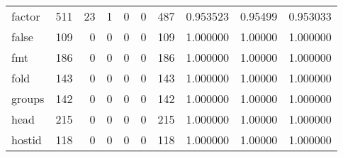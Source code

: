 \begin{longtable}{lrrrrrrrrr}
factor    &                    511 &                                 23 &                                 1 &                                0 &                                 0 &                             487 &                                0.953523 &                                0.95499 &                             0.953033 \\
false     &                    109 &                                  0 &                                 0 &                                0 &                                 0 &                             109 &                                1.000000 &                                1.00000 &                             1.000000 \\
fmt       &                    186 &                                  0 &                                 0 &                                0 &                                 0 &                             186 &                                1.000000 &                                1.00000 &                             1.000000 \\
fold      &                    143 &                                  0 &                                 0 &                                0 &                                 0 &                             143 &                                1.000000 &                                1.00000 &                             1.000000 \\
groups    &                    142 &                                  0 &                                 0 &                                0 &                                 0 &                             142 &                                1.000000 &                                1.00000 &                             1.000000 \\
head      &                    215 &                                  0 &                                 0 &                                0 &                                 0 &                             215 &                                1.000000 &                                1.00000 &                             1.000000 \\
hostid    &                    118 &                                  0 &                                 0 &                                0 &                                 0 &                             118 &                                1.000000 &                                1.00000 &                             1.000000 \\

\end{longtable}
